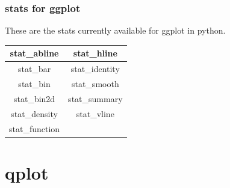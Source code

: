 \documentclass{beamer}
\begin{document}
\begin{frame}
	\frametitle{stats for ggplot}
	\Large
	These are the stats currently available for ggplot in python.\\
	\bigskip
	\begin{center}
		\begin{tabular}{|c|c|}\hline
			stat\_abline	&	stat\_hline	\\ \hline
			stat\_bar	&	stat\_identity	\\ \hline
			stat\_bin	&	stat\_smooth	\\ \hline
			stat\_bin2d	&	stat\_summary	\\ \hline
			stat\_density	&	stat\_vline	\\ \hline
			stat\_function	&		\\ \hline
		\end{tabular} 
	\end{center}
\end{frame}
%	
%	
\section{qplot}
\end{document}

